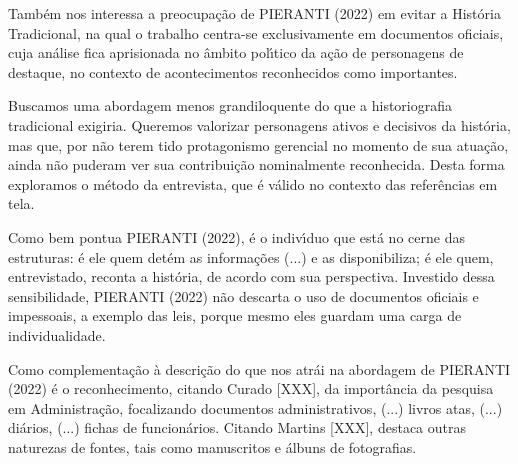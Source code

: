 \documentclass[
12pt,		%
openright,	%
twoside,  %
a4paper,			%
chapter=TITLE,		%
english,			%
french,				%
spanish,			%
brazil				%
]{USPSC-classe/USPSC}
\begin{document}
Tamb\'em nos interessa a preocupa\c{c}\~ao de  PIERANTI (2022) em evitar a Hist\'oria Tradicional, na qual o trabalho centra-se exclusivamente em documentos oficiais, cuja an\'alise fica aprisionada no \^ambito pol\'{\i}tico da a\c{c}\~ao de \textquotedbl personagens de destaque\textquotedbl , no contexto de \textquotedbl acontecimentos reconhecidos como importantes\textquotedbl .









Buscamos uma abordagem menos grandiloquente do que a historiografia tradicional exigiria. Queremos valorizar personagens ativos e decisivos da hist\'oria, mas que, por n\~ao terem tido protagonismo gerencial no momento de sua atua\c{c}\~ao, ainda n\~ao puderam ver sua contribui\c{c}\~ao nominalmente reconhecida. Desta forma exploramos o m\'etodo da entrevista, que \'e v\'alido no contexto das refer\^encias em tela.









Como bem pontua  PIERANTI (2022), \textquotedbl \'e o indiv\'{\i}duo que est\'a no cerne das estruturas: \'e ele quem det\'em as informa\c{c}\~oes (...) e as disponibiliza; \'e ele quem, entrevistado, reconta a hist\'oria, de acordo com sua perspectiva\textquotedbl . Investido dessa sensibilidade,  PIERANTI (2022) n\~ao descarta o uso de documentos oficiais e impessoais, a exemplo das leis, porque mesmo eles \textquotedbl guardam uma carga de individualidade\textquotedbl .









Como complementa\c{c}\~ao \`a descri\c{c}\~ao do que nos atr\'ai na abordagem de  PIERANTI (2022) \'e o reconhecimento, citando Curado [XXX], da import\^ancia da pesquisa em Administra\c{c}\~ao, focalizando \textquotedbl documentos administrativos, (...) livros atas, (...) di\'arios, (...) fichas de funcion\'arios\textquotedbl . Citando Martins [XXX], destaca outras naturezas de fontes, tais como manuscritos e \'albuns de fotografias.
\end{document}
